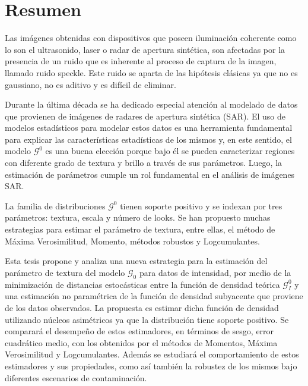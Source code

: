 
\chapter{Resumen}

Las imágenes obtenidas con dispositivos que poseen iluminación coherente como lo son el ultrasonido, laser o radar de apertura sintética, son afectadas por la presencia de un ruido que es inherente al proceso de captura de la imagen, llamado ruido speckle. Este ruido se aparta de las hipótesis clásicas ya que no es gaussiano, no es aditivo y es difícil de eliminar. 

Durante la última década se ha dedicado especial atención al modelado de datos que provienen de imágenes de radares de apertura sintética (SAR). El uso de modelos estadísticos para modelar estos datos es una herramienta fundamental para explicar las características estadísticas de los mismos y, en este sentido, el modelo $\mathcal{G}^0$ es una buena elección porque bajo él se pueden caracterizar regiones con diferente grado de textura y brillo a través de sus parámetros. Luego, la estimación de parámetros cumple un rol fundamental en el análisis de imágenes SAR.  

La familia de distribuciones $\mathcal{G}^0$  tienen soporte positivo y se indexan por tres parámetros: textura, escala y número de looks. %
Se han propuesto muchas estrategias para estimar el parámetro de textura, entre ellas, el método de Máxima Verosimilitud, Momento, métodos robustos y Logcumulantes.

Esta tesis propone y analiza una nueva estrategia para la estimación del parámetro de textura del modelo $\mathcal G_0$ para datos de intensidad, por medio de la minimización de distancias estocásticas entre la función de densidad teórica $\mathcal{G}_I^0$ y una estimación no paramétrica de la función de densidad subyacente que proviene de los datos observados. La propuesta es estimar dicha función de densidad utilizando núcleos asimétricos ya que la distribución tiene soporte positivo. Se comparará el desempeño de estos estimadores, en términos de sesgo, error cuadrático medio, con los obtenidos por el métodos de Momentos, Máxima Verosimilitud y Logcumulantes. Además se estudiará el comportamiento de estos estimadores y sus propiedades, como así también la robustez de los mismos bajo diferentes escenarios de contaminación.